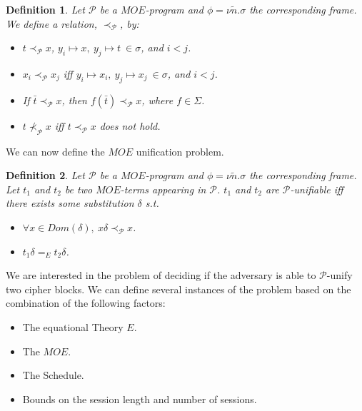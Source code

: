 \documentclass[11pt,twoside,a4paper]{article}
\newtheorem{definition}{Definition}
\begin{document}
\begin{definition}
	Let $\mathcal{P}$ be a $MOE$-program and $\phi = \nu \tilde{n}.\sigma$ the corresponding frame. We define a relation, 
	$\prec_{\mathcal{P}}$, by:
	\begin{itemize}
		\item $t \prec_{\mathcal{P}} x$,
		$y_i \mapsto x, ~y_j \mapsto t ~ \in \sigma$, and
		$ i < j$.
		\item $x_i \prec_{\mathcal{P}} x_j$ iff 
		 $y_i \mapsto x_i, ~y_j \mapsto x_j ~ \in \sigma$, and
		 $ i < j$.
		 \item If $\bar{t} \prec_{\mathcal{P}} x$, then 
		 $f(\bar{t}) \prec_{\mathcal{P}} x$, where $f \in \Sigma$.
		 \item $t \not \prec_{\mathcal{P}} x$ iff $t \prec_{\mathcal{P}} x$ does not hold.
	\end{itemize}
\end{definition}

We can now define the $MOE$ unification problem.

\begin{definition}
	Let $\mathcal{P}$ be a $MOE$-program and $\phi = \nu \tilde{n}.\sigma$ the corresponding frame. Let $t_1$ and $t_2$
	be two $MOE$-terms appearing in $\mathcal{P}$. $t_1$ and $t_2$
	are $\mathcal{P}$-unifiable iff there exists some substitution
	$\delta$ s.t.
	\begin{itemize}
		\item $\forall x \in Dom(\delta), ~x\delta \prec_{\mathcal{P}} x$.
		\item $t_1 \delta =_E t_2\delta$.
	\end{itemize}
\end{definition}

We are interested in the problem of deciding if the adversary is able to $\mathcal{P}$-unify two cipher blocks. We can define several instances of the problem based on the combination of the following factors:
\begin{itemize}
	\item The equational Theory $E$.
	\item The $MOE$.
	\item The Schedule.
	\item Bounds on the session length and number of sessions.  
\end{itemize}
\end{document}
